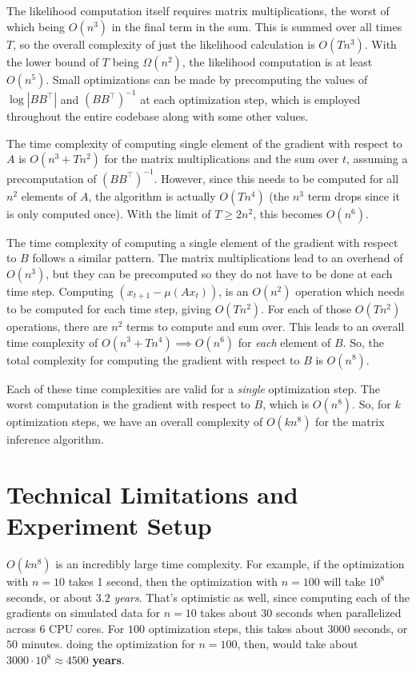\documentclass{article}
\theoremstyle{definition}
\begin{document}
The likelihood computation itself requires matrix multiplications, the worst of which being $O(n^3)$ in the final term in the sum. This is summed over all times $T$, so the overall complexity of just the likelihood calculation is $O(Tn^3)$. With the lower bound of $T$ being $\Omega(n^2)$, the likelihood computation is at least $O(n^5)$. Small optimizations can be made by precomputing the values of $\log|BB^\top|$ and $(BB^\top)^{-1}$ at each optimization step, which is employed throughout the entire codebase along with some other values. 

The time complexity of computing single element of the gradient with respect to $A$ is $O(n^3 + Tn^2)$ for the matrix multiplications and the sum over $t$, assuming a precomputation of $(BB^\top)^{-1}$. However, since this needs to be computed for all $n^2$ elements of $A$, the algorithm is actually $O(Tn^4)$ (the $n^3$ term drops since it is only computed once). With the limit of $T \geq 2n^2$, this becomes $O(n^6)$.

The time complexity of computing a single element of the gradient with respect to $B$ follows a similar pattern. The matrix multiplications lead to an overhead of $O(n^3)$, but they can be precomputed so they do not have to be done at each time step. Computing $(x_{t+1} - \mu(Ax_t))$, is an $O(n^2)$ operation which needs to be computed for each time step, giving $O(Tn^2)$. For each of those $O(Tn^2)$ operations, there are $n^2$ terms to compute and sum over. This leads to an overall time complexity of $O(n^3 + Tn^4) \implies O(n^6)$ for \textit{each} element of $B$. So, the total complexity for computing the gradient with respect to $B$ is $O(n^8)$.

Each of these time complexities are valid for a \textit{single} optimization step. The worst computation is the gradient with respect to $B$, which is $O(n^8)$. So, for $k$ optimization steps, we have an overall complexity of $O(kn^8)$ for the matrix inference algorithm.

\section{Technical Limitations and Experiment Setup}

$O(kn^8)$ is an incredibly large time complexity. For example, if the optimization with $n=10$ takes 1 second, then the optimization with $n=100$ will take $10^8$ seconds, or about $3.2$ \textit{years}. That's optimistic as well, since computing each of the gradients on simulated data for $n=10$ takes about $30$ seconds when parallelized across 6 CPU cores. For $100$ optimization steps, this takes about $3000$ seconds, or $50$ minutes. doing the optimization for $n=100$, then, would take about $3000 \cdot 10^8 \approx 4500$ \textbf{years}.
\end{document}

